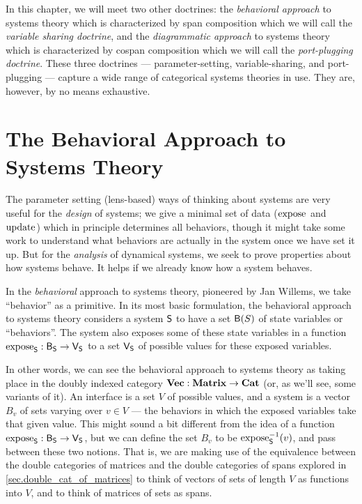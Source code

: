 \documentclass[DynamicalBook]{subfiles}
\begin{document}
  In this chapter, we will meet two other doctrines: the \emph{behavioral approach} to systems theory which is characterized by span composition which we will call the \emph{variable sharing doctrine}, and the \emph{diagrammatic approach} to systems theory which is characterized by cospan composition which we will call the \emph{port-plugging doctrine}. These three doctrines --- parameter-setting, variable-sharing, and port-plugging --- capture a wide range of categorical systems theories in use. They are, however, by no means exhaustive.





\section{The Behavioral Approach to Systems Theory}\label{sec:behavioral.approach}

The parameter setting (lens-based) ways of thinking about systems are very useful for the \emph{design} of systems; we give
a minimal set of data ($\mathrm{expose}_{\mathsf{}}$ and $\mathrm{update}_{\mathsf{}}$) which in principle determines all behaviors, though it
might take some work to understand what behaviors are actually in the system
once we have set it up. But for the \emph{analysis} of dynamical systems, we
seek to prove properties about how systems behave. It helps if we
already know how a system behaves.

In the \emph{behavioral} approach to systems theory, pioneered by Jan Willems,
we take ``behavior'' as a primitive. In its most basic formulation, the behavioral
approach to systems theory considers a system $\mathsf{S}$ to have a set
$\mathsf{B}(S)$ of state variables or ``behaviors''. The system also exposes some of these
state variables in a function $\mathrm{expose}_{\mathsf{S}} : \mathsf{B}_{\mathsf{S}} \to \mathsf{V}_{\mathsf{S}}$
to a set
$\mathsf{V}_{\mathsf{S}}$ of possible values for these exposed variables.

In other words, we can see the behavioral approach to systems theory as taking
place in the doubly indexed category $\textbf{Vec} : \textbf{Matrix} \to \textbf{Cat}$
(or, as we'll see, some variants of it). An interface is a set $V$ of possible
values, and a system is a vector $B_v$ of sets varying over $v \in V$ --- the behaviors in
which the exposed variables take that given value. This might sound a bit
different from the idea of a function $\mathrm{expose}_{\mathsf{S}} : \mathsf{B}_{\mathsf{S}} \to
\mathsf{V}_{\mathsf{S}}$, but we can define the set $B_v$ to be $\mathrm{expose}_{\mathsf{S}}^{-1}(v)$,
and pass between these two notions. That is, we are making use of the
equivalence between the double categories of matrices and the double categories
of spans explored in \cref{sec.double_cat_of_matrices} to think of vectors of
sets of length $V$ as functions into $V$, and to think of matrices of sets as spans.
\end{document}
